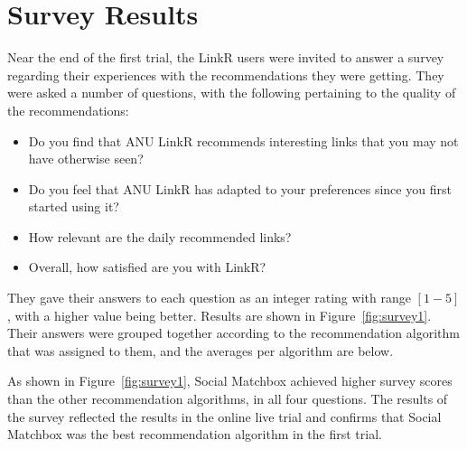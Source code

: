 \section{Survey Results}

Near the end of the first trial, the LinkR users were invited to answer a survey regarding their experiences with the recommendations they were getting. They were asked a number of questions, with the following pertaining to the quality of the recommendations:

\begin{itemize}
\item{Do you find that ANU LinkR recommends interesting links that you may not have otherwise seen?}
\item{Do you feel that ANU LinkR has adapted to your preferences since you first started using it?}
\item{How relevant are the daily recommended links?}
\item{Overall, how satisfied are you with LinkR?}
\end{itemize}

They gave their answers to each question as an integer rating with range $[1-5]$, with a higher value being better. Results are shown in Figure~\ref{fig:survey1}. Their answers were grouped together according to the recommendation algorithm that was assigned to them, and the averages per algorithm are below.

As shown in Figure~\ref{fig:survey1}, Social Matchbox achieved higher survey scores than the other recommendation algorithms, in all four questions. The results of the survey reflected the results in the online live trial and confirms that Social Matchbox was the best recommendation algorithm in the first trial.
 
